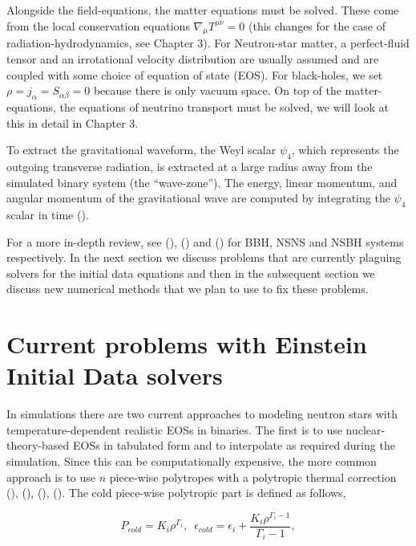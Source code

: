 Alongside the field-equations, the matter equations must be solved. These come from the local conservation equations $\nabla_{\mu}T^{\mu\nu} = 0$ (this changes for the case of radiation-hydrodynamics, see Chapter 3). For Neutron-star matter, a perfect-fluid tensor and an irrotational velocity distribution are usually assumed and are coupled with some choice of equation of state (EOS). For black-holes, we set $\rho = j_{\alpha} = S_{\alpha\beta} = 0$ because there is only vacuum space. On top of the matter-equations, the equations of neutrino transport must be solved, we will look at this in detail in Chapter 3.

To extract the gravitational waveform, the Weyl scalar $\psi_{4}$, which represents the outgoing transverse radiation, is extracted at a large radius away from the simulated binary system (the ``wave-zone''). The energy, linear momentum, and angular momentum of the gravitational wave are computed by integrating the $\psi_{4}$ scalar in time (\cite{kyutoku2015dynamical}).

For a more in-depth review, see (\cite{sperhake2014numerical}), (\cite{faber2012binary}) and (\cite{shibata2011coalescence}) for BBH, NSNS and NSBH systems respectively. In the next section we discuss problems that are currently plaguing solvers for the initial data equations and then in the subsequent section we discuss new numerical methods that we plan to use to fix these problems.

\section{Current problems with Einstein Initial Data solvers}

In simulations there are two current approaches to modeling neutron stars with temperature-dependent realistic EOSs in binaries. The first is to use nuclear-theory-based EOSs in tabulated form and to interpolate as required during the simulation. Since this can be computationally expensive, the more common approach is to use $n$ piece-wise polytropes with a polytropic thermal correction (\cite{deaton2013black}), (\cite{kyutoku2013black}), (\cite{bauswein2014revealing}), (\cite{kyutoku2015dynamical}). The cold piece-wise polytropic part is defined as follows,

\begin{equation}
\label{eq:7}
P_{cold} = K_i\rho^{\Gamma_i},\,\,\, \epsilon_{cold} = \epsilon_i + \frac{K_{i}\rho^{\Gamma_{i}-1}}{\Gamma_{i}-1},
\end{equation}

